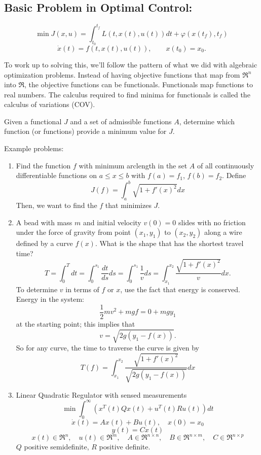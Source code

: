 \subsection{Basic  Problem in Optimal Control:}
$$\min J(x,u)=\int_{t_0}^{t_f} L(t,x(t),u(t)) dt + \varphi(x(t_f),t_f)$$
\hspace{1.5in}{\it subject to}
$$\dot x(t) = f(t,x(t),u(t)), \qquad  x(t_0) = x_0.$$

To work up to solving this, we'll follow the pattern of what we did with algebraic optimization problems.  Instead of having objective functions that map from $\Re^n$ into $\Re$, the objective functions can be functionals.  Functionals map functions to real numbers. The calculus required to find minima for functionals is called the calculus of variations (COV).

 Given a functional $J$ and a set of admissible functions $A$, determine which function (or functions) provide a minimum value for $J$.

\bigskip
\noindent Example problems:
\begin{enumerate}
\item Find the function $f$ with minimum arclength in the set $A$ of all continuously differentiable functions on $a\leq x\leq b$ with $f(a) = f_1$, $f(b) = f_2$. Define
$$J(f) = \int_a^b \sqrt{1+f'(x)^2}dx$$
Then, we want to find the $f$ that minimizes $J$.
\item A bead with mass $m$ and initial velocity $v(0) = 0$ slides with no friction under the force of gravity from point $(x_1, y_1)$ to $(x_2, y_2)$ along a wire defined by a curve $f(x)$. What is the shape that has the shortest travel time?
$$T = \int_0^Tdt = \int_0^{s_1} \frac{dt}{ds} ds = \int_0^{s_1} \frac 1v ds = \int_{x_1}^{x_2}\frac{ \sqrt{1+f'(x)^2}}vdx.$$
To determine $v$ in terms of $f$ or $x$, use the fact that energy is conserved. Energy in the system:
$$\frac 12 mv^2 + mgf = 0 + mgy_1$$
at the starting point; this implies that
$$v = \sqrt{2g(y_1-f(x))}.$$
So for any curve, the time to traverse the curve is given by
$$T(f) = \int_{x_1}^{x_2}\frac{ \sqrt{1+f'(x)^2}}{\sqrt{2g(y_1-f(x))}}dx$$
\item Linear Quadratic Regulator with sensed measurements
$$\min \int_0^{\infty} \left(x^T(t)Qx(t) + u^T(t)Ru(t) \right)dt$$
\hspace{1.5in}{\it subject to}
$$\dot x(t) = Ax(t) + Bu(t), \quad x(0) = x_0$$
$$ y(t) = Cx(t)$$
$$ x(t) \in \Re^n, \quad u(t) \in \Re^m, \quad A\in\Re ^{n\times n }, \quad B\in \Re ^{n\times m}, \quad C\in\Re^{n\times p}$$
$Q$ positive semidefinite, $R$ positive definite.
\end{enumerate}

